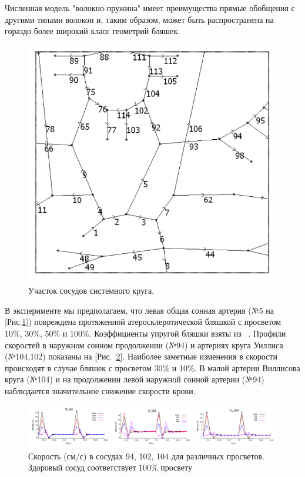 Численная модель "волокно-пружина" имеет преимущества прямые обобщения с другими типами волокон и, таким образом, может быть распространена на гораздо более широкий класс геометрий бляшек.

\begin{figure}[h]
\centering
\includegraphics[width=0.4\linewidth]{chast.png}
\caption{Участок сосудов системного круга.}
\label{ych}
\end{figure}

В эксперименте мы предполагаем, что левая общая сонная артерия (№5 на [Рис.\ref{ych}]) 
повреждена протяженной атеросклеротической бляшкой с просветом 10\%, 30\%, 50\% и 
100\%. Коэффициенты упругой бляшки взяты из ~\cite{vassilevski:2011}. Профили скоростей в наружном сонном продолжении (№94) и артериях круга Уиллиса (№104,102) показаны на [Рис.~\ref{sc}]. 
Наиболее заметные изменения в скорости происходят в случае бляшек с просветом 30\% и 10\%. В малой артерии Виллисова круга (№104) и на продолжении левой наружной сонной артерии (№94) наблюдается значительное снижение скорости крови.

\begin{figure}[h]
\centering
\includegraphics[width=1\linewidth]{grap.png}
\caption{Скорость (см/с) в сосудах 94, 102, 104 для различных просветов. Здоровый сосуд
соответствует 100\% просвету}
\label{sc}
\end{figure}
